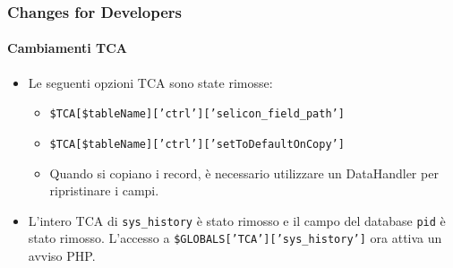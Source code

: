 \begin{frame}[fragile]
	\frametitle{Changes for Developers}
	\framesubtitle{Cambiamenti TCA}

	\begin{itemize}
		\item Le seguenti opzioni TCA sono state rimosse:

			\begin{itemize}
				\item \texttt{\$TCA[\$tableName]['ctrl']['selicon\_field\_path']}
				\item \texttt{\$TCA[\$tableName]['ctrl']['setToDefaultOnCopy']}
			\end{itemize}

			\begin{itemize}\smaller
				\item[\ding{228}] Quando si copiano i record, è necessario utilizzare un DataHandler per ripristinare i campi.
			\end{itemize}\normalsize

		\item L'intero TCA di \texttt{sys\_history} è stato rimosso e il campo del database \texttt{pid} è stato rimosso.
			L'accesso a \texttt{\$GLOBALS['TCA']['sys\_history']} ora attiva un avviso PHP.

	\end{itemize}

\end{frame}


